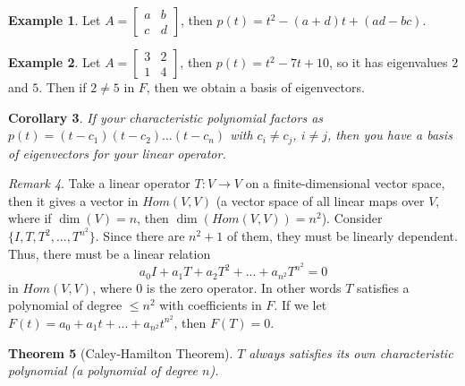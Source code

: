 \documentclass[12pt]{article}
\newtheorem{thm}{Theorem}[section]
\newtheorem{cor}[thm]{Corollary}
\theoremstyle{definition}
\newtheorem{eg}[thm]{Example}
\theoremstyle{remark}
\newtheorem{rmk}[thm]{Remark}
\numberwithin{equation}{section}
\begin{document}
\vspace{15pt}

\begin{eg}
        Let $A = \begin{bmatrix} a& b \\ c & d\end{bmatrix}$, then $p(t) = t^2 - (a+d)t + (ad - bc)$.
\end{eg}


\vspace{15pt}

\begin{eg}
        Let $A = \begin{bmatrix} 3& 2 \\ 1 & 4\end{bmatrix}$, then $p(t) = t^2 - 7t + 10$, so it has eigenvalues $2$ and $5$. Then if $2 \neq 5$ in $F$, then we obtain a basis of eigenvectors.
\end{eg}


\vspace{15pt}

\begin{cor}
        If your characteristic polynomial factors as $p(t) = (t-c_1)(t-c_2)...(t-c_n)$ with $c_i \neq c_j$, $i \neq j$, then you have a basis of eigenvectors for your linear operator.
\end{cor}


\vspace{15pt}


\begin{rmk}
        Take a linear operator $T:V\rightarrow V$ on a finite-dimensional vector space, then it gives a vector in $Hom(V,V)$ (a vector space of all linear maps over $V$, where if $\dim(V) = n$, then $\dim(Hom(V,V)) = n^2$). Consider $\{I,T,T^2,...,T^{n^2}\}$. Since there are $n^2+1$ of them, they must be linearly dependent. Thus, there must be a linear relation \begin{equation}
                a_0I + a_1T+a_2T^2+...+a_{n^2}T^{n^2} = 0
        \end{equation}
        in $Hom(V,V)$, where $0$ is the zero operator. In other words $T$ satisfies a polynomial of degree $\leq n^2$ with coefficients in $F$. If we let $F(t) = a_0 + a_1t + ... + a_{n^2}t^{n^2}$, then $F(T) = 0$.
\end{rmk}

\begin{thm}[Caley-Hamilton Theorem]
        $T$ always satisfies its own characteristic polynomial (a polynomial of degree $n$).
\end{thm}
\end{document}
